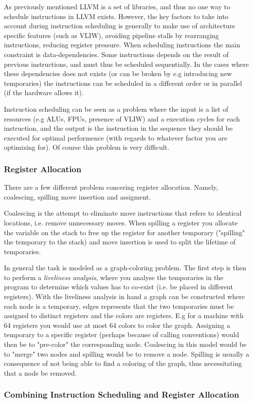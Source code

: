 
As previously mentioned LLVM is a set of libraries, and thus no one way to schedule instructions
in LLVM exists. However, the key factors to take into account during instruction scheduling
is generally to make use of architecture specific features (such as VLIW), avoiding pipeline
stalls by rearranging instructions, reducing register pressure. When scheduling instructions
the main constraint is data-dependencies. Some instructions depends on the result of previous
instructions, and must thus be scheduled sequentially. In the cases where these dependencies
does not exists (or can be broken by e.g introducing new temporaries) the instructions
can be scheduled in a different order or in parallel (if the hardware allows it).

Instruction scheduling can be seen as a problem where the input is a list of resources
(e.g ALUs, FPUs, presence of VLIW) and a execution cycles for each instruction, and the
output is the instruction in the sequence they should be executed for optimal performence
(with regards to whatever factor you are optimizing for). Of course this problem is very
difficult.

\subsubsection{Register Allocation}

There are a few different problem concering register allocation. Namely, coalescing, spilling
move insertion and assigment.

Coalescing is the attempt to eliminate move instructions that refers to identical locations,
i.e. remove unnecessary moves. When spilling a register you allocate the variable on the
stack to free up the register for another temporary ("spilling" the temporary to the stack)
and move insertion is used to split the lifetime of temporaries.

In general the task is modeled as a graph-coloring problem. The first step is then to
perform a \textit{liveliness analysis}, where you analyse the temporaries in the program
to determine which values has to co-exist (i.e. be placed in different registers). With
the liveliness analysis in hand a graph can be constructed where each node is a temporary,
edges represents that the two temporaries must be assigned to distinct registers and the
colors are registers. E.g for a machine with 64 registers you would use at most 64 colors
to color the graph. Assigning a temporary to a specific register (perhaps because of
calling conventions) would then be to "pre-color" the corresponding node. Coalescing in
this model would be to "merge" two nodes and spilling would be to remove a node. Spilling
is usually a consequence of not being able to find a coloring of the graph, thus
necessitating that a node be removed.

\subsubsection{Combining Instruction Scheduling and Register Allocation}
